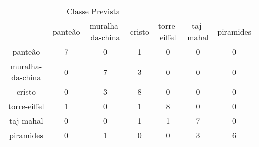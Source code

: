 \begin{tabular}{|c|c|c|c|c|c|c|}
\hline
\multicolumn{5}{|c|}{Classe Prevista}\\
 & panteão & muralha-da-china & cristo & torre-eiffel & taj-mahal & piramides\\
panteão & 7 & 0 & 1 & 0 & 0 & 0\\
muralha-da-china & 0 & 7 & 3 & 0 & 0 & 0\\
cristo & 0 & 3 & 8 & 0 & 0 & 0\\
torre-eiffel & 1 & 0 & 1 & 8 & 0 & 0\\
taj-mahal & 0 & 0 & 1 & 1 & 7 & 0\\
piramides & 0 & 1 & 0 & 0 & 3 & 6\\
\end{tabular}
